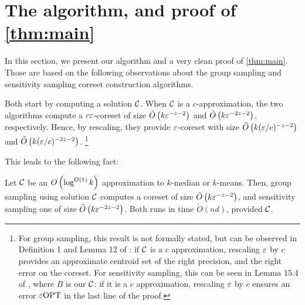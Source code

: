\section{The algorithm, and proof of \cref{thm:main}}

In this section, we present our algorithm and a very clean proof of \cref{thm:main}. Those are based on the following observations about the group
sampling \cite{stoc21} and sensitivity sampling \cite{FeldmanL11} coreset construction algorithms.

Both start by computing a solution $\mathcal C$. When $\mathcal C$ is a $c$-approximation, the two algorithms compute a $c \varepsilon$-coreset of size $\tilde O\left(
k \varepsilon^{-z-2}\right)$ and $\tilde O\left( k \varepsilon^{-2z -2}\right)$, respectively. Hence, by rescaling, they provide $\varepsilon$-coreset with size $\tilde O\left(
k (\varepsilon/c)^{-z-2}\right)$ and $\tilde O\left( k (\varepsilon/c)^{-2z-2}\right)$. \footnote{For group sampling, this result is not formally stated, but can be observed in Definition 1 and Lemma 12 of \cite{stoc21}: if $\mathcal C$ is a $c$ approximation, rescaling $\varepsilon$ by $c$ provides an approximate centroid set of the right precision, and the right error on the coreset. For sensitivity sampling, this can be seen in Lemma 15.4 of \cite{FLArxiv}, where $B$ is our $\mathcal C$: if it is a $c$ approximation, rescaling $\varepsilon$ by $c$ ensures an error $\varepsilon \text{OPT}$ in the last line of the proof.} 

This leads to the following fact:
\begin{fact}\label{fact:logApprox}
Let $\mathcal C$ be an $O\left( \log^{O(1)} k\right)$ approximation to $k$-median or $k$-means.
Then, group sampling using solution $\mathcal C$ computes a coreset of size $\tilde O\left(
k \varepsilon^{-z-2}\right)$, and sensitivity sampling one of size $\tilde O\left( k \varepsilon^{-2z-2}\right)$. 
Both runs in time $\tilde O(nd)$, provided $\mathcal C$.
\end{fact}

%

